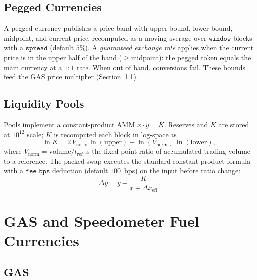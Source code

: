 \documentclass[11pt,a4paper]{article}
\theoremstyle{definition}
\newcommand{\FP}{10^{12}}
\begin{document}
\subsection{Pegged Currencies}
\label{sec:pegged}

A pegged currency publishes a price band with upper bound, lower bound,
midpoint, and current price, recomputed as a moving average over
$\texttt{window}$ blocks with a $\texttt{spread}$ (default $5\%$).  A
\emph{guaranteed exchange rate} applies when the current price is in the upper
half of the band (${\ge \mathrm{midpoint}}$): the pegged token equals the main
currency at a $1{:}1$ rate.  When out of band, conversions fail.  These bounds
feed the GAS price multiplier (Section~\ref{sec:gas}).

\subsection{Liquidity Pools}
\label{sec:pools}

Pools implement a constant-product AMM $x \cdot y = K$.  Reserves and $K$ are
stored at $\FP$ scale; $K$ is recomputed each block in log-space as
\[
\ln K = 2\,V_{\mathrm{norm}}\,\ln(\text{upper}) +
        \ln(V_{\mathrm{norm}})\,\ln(\text{lower}),
\]
where $V_{\mathrm{norm}} = \mathrm{volume}/t_{\mathrm{ref}}$ is the
fixed-point ratio of accumulated trading volume to a reference.  The packed
swap executes the standard constant-product formula with a $\texttt{fee\_bps}$
deduction (default $100$~bps) on the input before ratio change:
\[
\Delta y = y - \frac{K}{x + \Delta x_{\mathrm{eff}}}.
\]

\section{GAS and Speedometer Fuel Currencies}
\label{sec:fuel}

\subsection{GAS}
\label{sec:gas}
\end{document}
